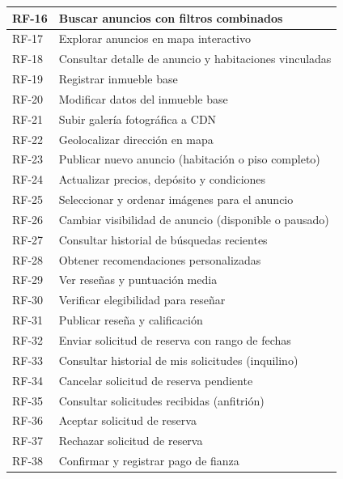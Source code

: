 \begin{longtable}{|p{2cm}|p{12cm}|}
    RF-16 & Buscar anuncios con filtros combinados \\ \hline
    RF-17 & Explorar anuncios en mapa interactivo \\ \hline
    RF-18 & Consultar detalle de anuncio y habitaciones vinculadas \\ \hline
    RF-19 & Registrar inmueble base \\ \hline
    RF-20 & Modificar datos del inmueble base \\ \hline
    RF-21 & Subir galería fotográfica a CDN \\ \hline
    RF-22 & Geolocalizar dirección en mapa \\ \hline
    RF-23 & Publicar nuevo anuncio (habitación o piso completo) \\ \hline
    RF-24 & Actualizar precios, depósito y condiciones \\ \hline
    RF-25 & Seleccionar y ordenar imágenes para el anuncio \\ \hline
    RF-26 & Cambiar visibilidad de anuncio (disponible o pausado) \\ \hline
    RF-27 & Consultar historial de búsquedas recientes \\ \hline
    RF-28 & Obtener recomendaciones personalizadas \\ \hline

    RF-29 & Ver reseñas y puntuación media \\ \hline
    RF-30 & Verificar elegibilidad para reseñar \\ \hline
    RF-31 & Publicar reseña y calificación \\ \hline

    RF-32 & Enviar solicitud de reserva con rango de fechas \\ \hline
    RF-33 & Consultar historial de mis solicitudes (inquilino) \\ \hline
    RF-34 & Cancelar solicitud de reserva pendiente \\ \hline
    RF-35 & Consultar solicitudes recibidas (anfitrión) \\ \hline
    RF-36 & Aceptar solicitud de reserva \\ \hline
    RF-37 & Rechazar solicitud de reserva \\ \hline
    RF-38 & Confirmar y registrar pago de fianza \\ \hline


\end{longtable}

